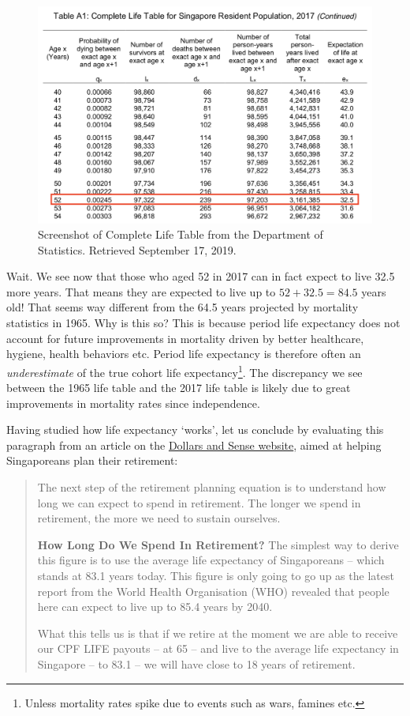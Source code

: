 \documentclass[
  openany]{book}
\begin{document}
\begin{figure}

{\centering \includegraphics[width=0.8\linewidth]{images/apc/apc_lifetable2} 

}

\caption{Screenshot of Complete Life Table from the Department of Statistics. Retrieved September 17, 2019.}\label{fig:apc-lifetabletwo}
\end{figure}

Wait. We see now that those who aged 52 in 2017 can in fact expect to live 32.5 more years. That means they are expected to live up to \(52 + 32.5 = 84.5\) years old! That seems way different from the 64.5 years projected by mortality statistics in 1965. Why is this so? This is because period life expectancy does not account for future improvements in mortality driven by better healthcare, hygiene, health behaviors etc. Period life expectancy is therefore often an \emph{underestimate} of the true cohort life expectancy\footnote{Unless mortality rates spike due to events such as wars, famines etc.}. The discrepancy we see between the 1965 life table and the 2017 life table is likely due to great improvements in mortality rates since independence.

Having studied how life expectancy `works', let us conclude by evaluating this paragraph from an article on the \href{https://dollarsandsense.sg/retirement-planning-singapore-live-beyond-average-life-expectancy/}{Dollars and Sense website}, aimed at helping Singaporeans plan their retirement:

\begin{quote}
The next step of the retirement planning equation is to understand how long we can expect to spend in retirement. The longer we spend in retirement, the more we need to sustain ourselves.

\textbf{How Long Do We Spend In Retirement?}
The simplest way to derive this figure is to use the average life expectancy of Singaporeans -- which stands at 83.1 years today. This figure is only going to go up as the latest report from the World Health Organisation (WHO) revealed that people here can expect to live up to 85.4 years by 2040.

What this tells us is that if we retire at the moment we are able to receive our CPF LIFE payouts -- at 65 -- and live to the average life expectancy in Singapore -- to 83.1 -- we will have close to 18 years of retirement.
\end{quote}
\end{document}
